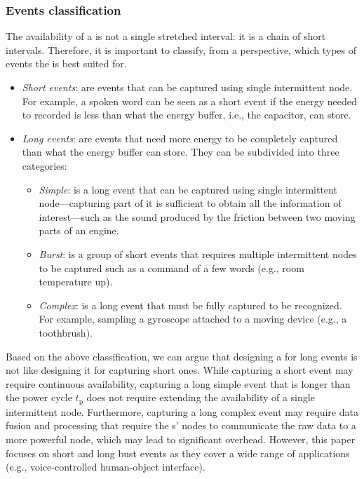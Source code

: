 \subsubsection{Events classification}
\label{sec:event_classification}
The availability of a \sys is not a single stretched interval: it is a chain of short intervals. Therefore, it is important to classify, from a \sys perspective, which types of events the \sys is best suited for. 
%
\begin{itemize}
\item \textit{Short events}: are events that can be captured using single intermittent node. For example, a spoken word can be seen as a short event if the energy needed to recorded is less than what the energy buffer, i.e., the capacitor, can store.
\item \textit{Long events}: are events that need more energy to be completely captured than what the energy buffer can store. They can be subdivided into three categories: 
	\begin{itemize}
		\item \textit{Simple}: is a long event that can be captured using single intermittent node---capturing part of it is sufficient to obtain all the information of interest---such as the sound produced by the friction between two moving parts of an engine. 
		\item \textit{Burst}: is a group of short events that requires multiple intermittent nodes to be captured such as a command of a few words (e.g., room temperature up).
		\item \textit{Complex}: is a long event that must be fully captured to be recognized. For example, sampling a gyroscope attached to a moving device (e.g., a toothbrush).

	\end{itemize}
\end{itemize}

Based on the above classification, we can argue that designing a \sys for long events is not like designing it for capturing short ones. While capturing a short event may require continuous \sys availability, capturing a long simple event that is longer than the power cycle $t_\text{p}$ does not require extending the availability of a single intermittent node. Furthermore, capturing a long complex event may require data fusion and processing that require the \sys{}s' nodes to communicate the raw data to a more powerful node, which may lead to significant overhead. However, this paper focuses on short and long bust events as they cover a wide range of applications (e.g., voice-controlled human-object interface). 

